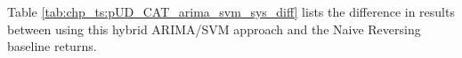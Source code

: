Table \ref{tab:chp_ts:pUD_CAT_arima_svm_sys_diff} lists the difference in results between using this hybrid ARIMA/SVM approach and the Naive Reversing baseline returns. 



%
%
%
%



